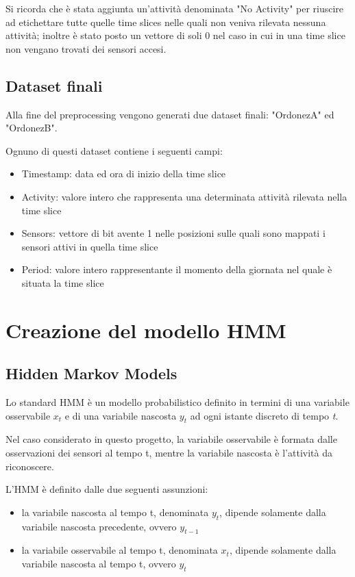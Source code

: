 \documentclass[10pt,a4paper]{article}
\begin{document}
Si ricorda che è stata aggiunta un'attività denominata "No Activity" per riuscire ad etichettare tutte quelle time slices nelle quali non veniva rilevata nessuna attività; inoltre è stato posto un vettore di soli 0 nel caso in cui in una time slice non vengano trovati dei sensori accesi.

\subsection{Dataset finali}
Alla fine del preprocessing vengono generati due dataset finali: "OrdonezA" ed "OrdonezB".

Ognuno di questi dataset contiene i seguenti campi:

\begin{itemize}
	\item Timestamp: data ed ora di inizio della time slice
	\item Activity: valore intero che rappresenta una determinata attività rilevata nella time slice
	\item Sensors: vettore di bit avente 1 nelle posizioni sulle quali sono mappati i sensori attivi in quella time slice
	\item Period: valore intero rappresentante il momento della giornata nel quale è situata la time slice
\end{itemize}
\clearpage

\section{Creazione del modello HMM}

\subsection{Hidden Markov Models}
Lo standard HMM è un modello probabilistico definito in termini di una variabile osservabile $ x_{t} $ e di una variabile nascosta $ y_{t} $ ad ogni istante discreto di tempo \textit{t}.

Nel caso considerato in questo progetto, la variabile osservabile è formata dalle osservazioni dei sensori al tempo t, mentre la variabile nascosta è l'attività da riconoscere.

L'HMM è definito dalle due seguenti assunzioni:

\begin{itemize}
	\item la variabile nascosta al tempo t, denominata $ y_{t} $, dipende solamente dalla variabile nascosta precedente, ovvero $ y_{t - 1} $
	\item la variabile osservabile al tempo t, denominata $ x_{t} $, dipende solamente dalla variabile nascosta al tempo t, ovvero $ y_{t} $
\end{itemize}
\end{document}
